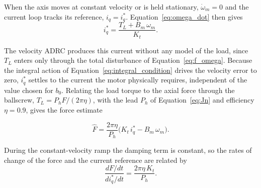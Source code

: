 When the axis moves at constant velocity or is held stationary, $\dot{\omega}_m = 0$ and the current loop tracks its reference, $i_q = i_q^{*}$. Equation~\eqref{eq:omega_dot} then gives
\begin{equation}
	i_q^{*} = \frac{T_L + B_m\,\omega_m}{K_t}.
	\label{eq:iq_load}
\end{equation}

The velocity ADRC produces this current without any model of the load, since $T_L$ enters only through the total disturbance of Equation~\eqref{eq:f_omega}. Because the integral action of Equation~\eqref{eq:integral_condition} drives the velocity error to zero, $i_q^{*}$ settles to the current the motor physically requires, independent of the value chosen for $b_0$. Relating the load torque to the axial force through the ballscrew, $T_L = P_h F / (2\pi\eta)$, with the lead $P_h$ of Equation~\eqref{eq:Jn} and efficiency $\eta = 0.9$, gives the force estimate \cite{altintas_manufacturing_2012}

\begin{equation}
	\hat{F} = \frac{2\pi\eta}{P_h}\Big( K_t\, i_q^{*} - B_m\,\omega_m \Big).
	\label{eq:force_estimate}
\end{equation}

During the constant-velocity ramp the damping term is constant, so the rates of change of the force and the current reference are related by
\begin{equation}
	\frac{dF/dt}{di_q^{*}/dt} = \frac{2\pi\eta\,K_t}{P_h}.
	\label{eq:slope_ratio}
\end{equation}

